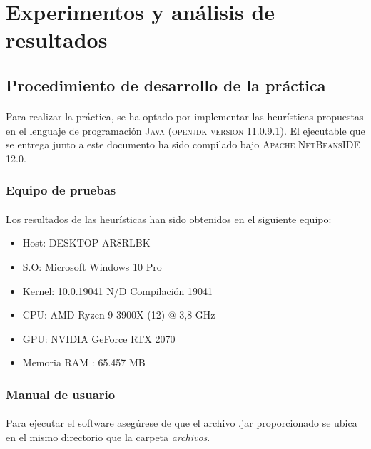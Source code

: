 \section{Experimentos y análisis de resultados}
	
	\subsection{Procedimiento de desarrollo de la práctica}
	
	\paragraph{}Para realizar la práctica, se ha optado por implementar las heurísticas propuestas en el lenguaje de programación \textsc{Java} (\textsc{openjdk version 11.0.9.1}). El ejecutable que se entrega junto a este documento ha sido compilado bajo \textsc{ Apache NetBeansIDE 12.0}.
	
	\subsubsection{Equipo de pruebas}
	
	\paragraph{}Los resultados de las heurísticas han sido obtenidos en el siguiente equipo:
	
		\begin{itemize}
			
			\item Host: DESKTOP-AR8RLBK
			\item S.O: Microsoft Windows 10 Pro
			\item Kernel: 10.0.19041 N/D Compilación 19041
			\item CPU: AMD Ryzen 9 3900X (12) @ 3,8 GHz
			\item GPU: NVIDIA GeForce RTX 2070
			\item Memoria RAM : 65.457 MB
			
		\end{itemize}

	\subsubsection{Manual de usuario}
	
		\paragraph{}Para ejecutar el software asegúrese de que el archivo .jar proporcionado se ubica en el mismo directorio que la carpeta \emph{archivos}. 
		
